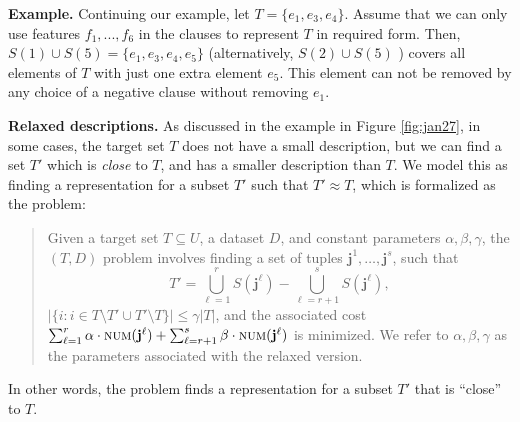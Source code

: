 
\noindent
\textbf{Example.}	
Continuing our example, let $T = \{e_1, e_3, e_4\}$. Assume that we can only use features $f_1, ..., f_6$ in the clauses to represent $T$ in required form. Then, $S(1) \cup S(5) = \{e_1, e_3, e_4, e_5\} $ (alternatively, $S(2) \cup S(5)$ ) covers all elements of $T$ with just one extra element $e_5$. This element can not be removed by any choice of a negative clause without removing $e_1$. 

\noindent
\textbf{Relaxed descriptions.} 
As discussed in the example in Figure \ref{fig:jan27}, in some cases, the
target set $T$ does not have a small description, but we can find a set $T'$
which is \emph{close} to $T$, and has a smaller description than $T$.
We model this as finding a representation for
a subset $T'$ such that $T'\approx T$, which is formalized as the
\minapproxdesc{} problem:
\begin{quote}
Given a target set $T\subseteq U$, a dataset $D$, and constant parameters
$\alpha, \beta, \gamma$, the \minapproxdesc{}$(T, D)$ problem involves
finding a set of tuples $\mathbf{j}^{1},\ldots,\mathbf{j}^{s}$,
such that
\[
T' = \bigcup_{\ell=1}^r S(\mathbf{j}^{\ell}) - \bigcup_{\ell=r+1}^s S(\mathbf{j}^{\ell}),
\]
$|\{i: i\in T\setminus T'\cup T'\setminus T\}| \leq\gamma |T|$,
and the associated cost
$\sum_{\ell=1}^r \alpha\cdot \textsc{num}(\mathbf{j}^{\ell}) + \sum_{\ell=r+1}^s \beta\cdot \textsc{num}(\mathbf{j}^{\ell})$ is minimized. 
We refer to $\alpha, \beta, \gamma$ as the parameters associated with the
relaxed version.
\end{quote}

In other words, the \minapproxdesc{} problem finds a representation for a subset $T'$
that is ``close'' to $T$.

